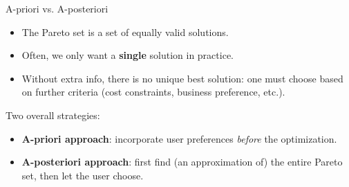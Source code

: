 \documentclass[11pt,compress,t,notes=noshow,xcolor=table]{beamer}
\begin{document}
\begin{vbframe}{A-priori vs. A-posteriori}

\begin{itemize}
\item The Pareto set is a set of equally valid solutions.
\item Often, we only want a \textbf{single} solution in practice.
\item Without extra info, there is no unique best solution: one must choose 
      based on further criteria (cost constraints, business preference, etc.).
\end{itemize}

\bigskip
Two overall strategies:
\begin{itemize}
\item \textbf{A-priori approach}: incorporate user preferences \emph{before} the optimization.
\item \textbf{A-posteriori approach}: first find (an approximation of) the entire Pareto set, 
      then let the user choose.
\end{itemize}

\end{vbframe}
\end{document}
